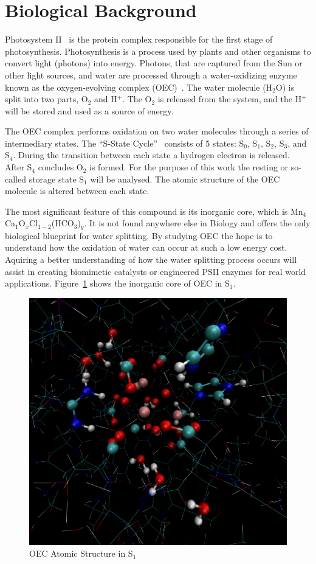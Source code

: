 \section{Biological Background}

Photosystem II~\cite{oxygenicPhotosynthesis} is the protein complex responsible for the first stage of photosynthesis. Photosynthesis is a process used by plants and other organisms to convert light (photons) into energy. Photons, that are captured from the Sun or other light sources, and water are processed through a water-oxidizing enzyme known as the oxygen-evolving complex (OEC)~\cite{yano2006manganese}. The water molecule (H$_{2}$O) is split into two parts, O$_{2}$ and H$^{+}$. The O$_{2}$ is released from the system, and the H$^{+}$ will be stored and used as a source of energy.

The OEC complex performs oxidation on two water molecules through a series of intermediary states. The ``S-State Cycle''~\cite{yano2006manganese} consists of 5 states: S$_{0}$, S$_{1}$, S$_{2}$, S$_{3}$, and S$_{4}$. During the transition between each state a hydrogen electron is released. After S$_{4}$ concludes O$_{2}$ is formed. For the purpose of this work the resting or so-called storage state S$_{1}$ will be analysed. The atomic structure of the OEC molecule is altered between each state.

The most significant feature of this compound is its inorganic core, which is \linebreak Mn$_{4}$Ca$_{1}$O$_{x}$Cl$_{1-2}$(HCO$_{3}$)$_{y}$. It is not found anywhere else in Biology and offers the only biological blueprint for water splitting. By studying OEC the hope is to understand how the oxidation of water can occur at such a low energy cost. Aquiring a better understanding of how the water splitting process occurs will assist in creating biomimetic catalysts or engineered PSII enzymes for real world applications. Figure~\ref{fig:oec-in-s1} shows the inorganic core of OEC in S$_{1}$.

\begin{figure}[H]
	\centering
	\includegraphics[bb=0 0 941 901,scale=0.3]{figures/structure.png}
	\caption{OEC Atomic Structure in S$_{1}$}
	\label{fig:oec-in-s1}
\end{figure}